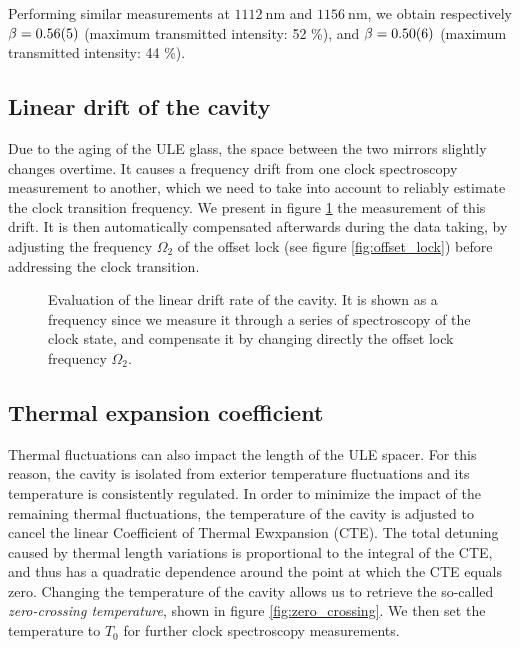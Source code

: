 \documentclass[11pt]{article}
\numberwithin{equation}{section}
\numberwithin{figure}{section}
\begin{document}
Performing similar measurements at $\SI{1112}{\nano\metre}$ and $\SI{1156}{\nano\metre}$, we obtain respectively $\beta = \num{0.56\pm0.05}$ (maximum transmitted intensity: 52 \%), and $\beta = \num{0.50\pm0.06}$ (maximum transmitted intensity: 44 \%). 

\subsection{Linear drift of the cavity}

Due to the aging of the ULE glass, the space between the two mirrors slightly changes overtime.  It causes a frequency drift from one clock spectroscopy measurement to another, which we need to take into account to reliably estimate the clock transition frequency. We present in figure \ref{fig:linear_drift} the measurement of this drift. It is then automatically compensated afterwards during the data taking, by adjusting the frequency $\Omega_2$ of the offset lock (see figure \ref{fig:offset_lock}) before addressing the clock transition.

%
\begin{figure}[htbp]
	\centering
    
	\caption{\small Evaluation of the linear drift rate of the cavity. It is shown as a frequency since we measure it through a series of spectroscopy of the clock state, and compensate it by changing directly the offset lock frequency $\Omega_2$.}
    \label{fig:linear_drift}
\end{figure}
%

\subsection{Thermal expansion coefficient}

Thermal fluctuations can also impact the length of the ULE spacer. For this reason, the cavity is isolated from exterior temperature fluctuations and its temperature is consistently regulated. In order to minimize the impact of the remaining thermal fluctuations, the temperature of the cavity is adjusted to cancel the linear Coefficient of Thermal Ewxpansion (CTE). The total detuning caused by thermal length variations is proportional to the integral of the CTE, and thus has a quadratic dependence around the point at which the CTE equals zero. Changing the temperature of the cavity allows us to retrieve the so-called \emph{zero-crossing temperature}, shown in figure \ref{fig:zero_crossing}. We then set the temperature to $T_0$ for further clock spectroscopy measurements.
\end{document}
